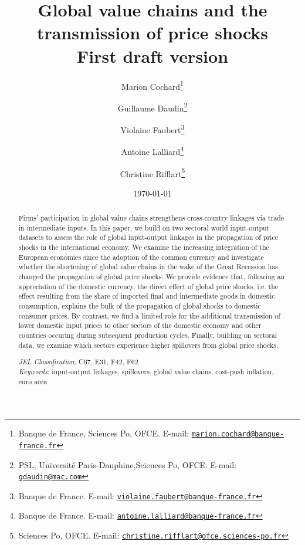 \documentclass[11pt,a4paper]{article}
\newcommand{\email}[1]{\href{mailto:#1}{\nolinkurl{#1}}}
\begin{document}
\title{Global value chains and the transmission of price shocks\\
\vspace{1cm}
\normalsize{First draft version}
}
\vspace{1cm}
\date{\today}
\author{Marion Cochard\thanks{Banque de France, Sciences Po, OFCE. E-mail: \email{marion.cochard@banque-france.fr}}\and Guillaume Daudin\thanks{PSL, Universit\'e Paris-Dauphine,Sciences Po, OFCE. E-mail: \email{gdaudin@mac.com}}\and Violaine Faubert\thanks{Banque de France. E-mail: \email{violaine.faubert@banque-france.fr}} \and Antoine Lalliard\thanks{Banque de France. E-mail: \email{antoine.lalliard@banque-france.fr}} \and Christine Rifflart\thanks{Sciences Po, OFCE. E-mail: \email{christine.rifflart@ofce.sciences-po.fr}}
}
\maketitle
\begin{abstract}
{\small \noindent
Firms' participation in global value chains strengthens cross-country linkages via trade in intermediate inputs. 
In this paper, we build on two sectoral world input-output datasets  to assess the role of global input-output linkages in the propagation of price shocks in the international economy. 
We examine the increasing integration of the European economies since the adoption of the common currency and investigate whether the shortening of global value chains in the wake of the Great Recession has changed the propagation of global price shocks. We provide evidence that, following an appreciation of the domestic currency, the direct effect of global price shocks, i.e. the effect resulting from the share of imported final and intermediate goods in domestic consumption, explains the bulk of the propagation of global shocks to domestic consumer prices. By contrast, we find a limited role for the additional transmission of lower domestic input prices to other sectors of the domestic economy and other countries occuring during subsequent production cycles. Finally, building on sectoral data, we examine which sectors experience higher spillovers from global price shocks.
}

{\small \bigskip \noindent \emph{JEL Classification}\/: C67, E31, F42, F62\\}
{\small \noindent \emph{Keywords}\/: input-output linkages, spillovers, global value chains, cost-push inflation, euro area \\ }
\end{abstract}
\end{document}
